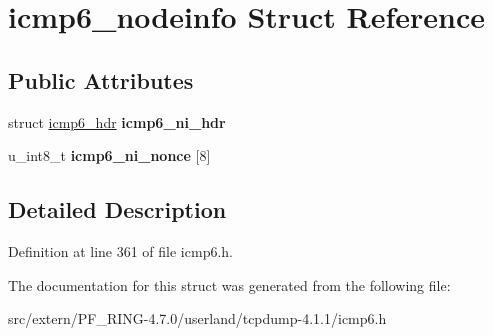 \hypertarget{structicmp6__nodeinfo}{
\section{icmp6\_\-nodeinfo Struct Reference}
\label{structicmp6__nodeinfo}
}
\subsection*{Public Attributes}
\begin{DoxyCompactItemize}
\item 
\hypertarget{structicmp6__nodeinfo_a7b6be4a8281360ca83efca1beb295b52}{
struct \hyperlink{structicmp6__hdr}{icmp6\_\-hdr} {\bfseries icmp6\_\-ni\_\-hdr}}
\label{structicmp6__nodeinfo_a7b6be4a8281360ca83efca1beb295b52}

\item 
\hypertarget{structicmp6__nodeinfo_ada93175ad1e607e69bae86ec411b95df}{
u\_\-int8\_\-t {\bfseries icmp6\_\-ni\_\-nonce} \mbox{[}8\mbox{]}}
\label{structicmp6__nodeinfo_ada93175ad1e607e69bae86ec411b95df}

\end{DoxyCompactItemize}


\subsection{Detailed Description}


Definition at line 361 of file icmp6.h.



The documentation for this struct was generated from the following file:\begin{DoxyCompactItemize}
\item 
src/extern/PF\_\-RING-\/4.7.0/userland/tcpdump-\/4.1.1/icmp6.h\end{DoxyCompactItemize}
